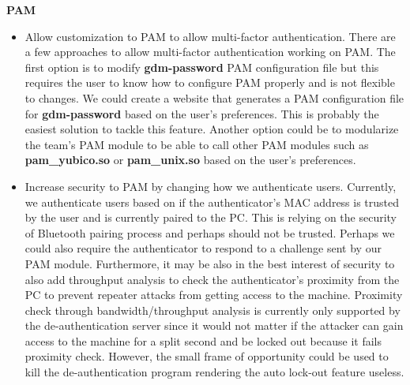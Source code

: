 \documentclass[letterpaper,twocolumn,10pt]{article}
\begin{document}
{{\textbf{PAM}
\begin{itemize}
\item Allow customization to PAM to allow multi-factor authentication. There are a few approaches to allow multi-factor authentication working on PAM. The first option is to modify \textbf{gdm-password} PAM configuration file but this requires the user to know how to configure PAM properly and is not flexible to changes. We could create a website that generates a PAM configuration file for \textbf{gdm-password} based on the user's preferences. This is probably the easiest solution to tackle this feature. Another option could be to modularize the team's PAM module to be able to call other PAM modules such as \textbf{pam\_yubico.so} or \textbf{pam\_unix.so} based on the user's preferences.
\item Increase security to PAM by changing how we authenticate users. Currently, we authenticate users based on if the authenticator's MAC address is trusted by the user and is currently paired to the PC. This is relying on the security of Bluetooth pairing process and perhaps should not be trusted. Perhaps we could also require the authenticator to respond to a challenge sent by our PAM module. Furthermore, it may be also in the best interest of security to also add throughput analysis to check the authenticator's proximity from the PC to prevent repeater attacks from getting access to the machine. Proximity check through bandwidth/throughput analysis is currently only supported by the de-authentication server since it would not matter if the attacker can gain access to the machine for a split second and be locked out because it fails proximity check. However, the small frame of opportunity could be used to kill the de-authentication program rendering the auto lock-out feature useless.
\end{itemize}

\hrulefill

}}
\end{document}
